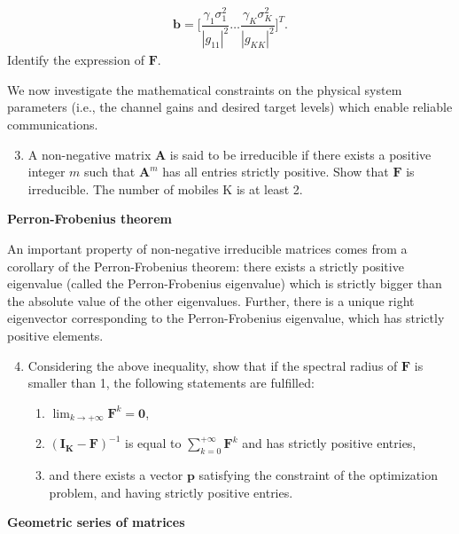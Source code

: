 \documentclass [a4paper, 11pt] {article}
\begin{document}
\begin{exercise}{2}
\begin{enumerate}
\begin{align}
    \mathbf{b} =  \Bigg[\dfrac{\gamma_1\sigma_1^2}{|g_{11}|^2} \hdots \dfrac{\gamma_K\sigma_K^2}{|g_{KK}|^2}\Bigg]^T.
\end{align}
Identify the expression of $\mathbf{F}$.
\end{enumerate}


We now investigate the mathematical constraints on the physical system parameters (i.e., the channel gains and desired target levels) which enable reliable communications. 

\begin{enumerate}
\setcounter{enumi}{2}
\item  A non-negative matrix $\mathbf{A}$ is said to be irreducible if there exists a positive integer $m$ such that $\mathbf{A}^m$ has all entries strictly positive. Show that $\mathbf{F}$ is irreducible. The number of mobiles K is at least 2.
\end{enumerate}


\textbf{Perron-Frobenius theorem}


An important property of non-negative irreducible matrices comes from a corollary of the Perron-Frobenius theorem: there exists a strictly positive eigenvalue (called the Perron-Frobenius eigenvalue) which is strictly bigger than the absolute value of the other eigenvalues. Further, there is a unique right eigenvector corresponding to the Perron-Frobenius eigenvalue, which has strictly positive elements.

\begin{enumerate}
\setcounter{enumi}{3}
\item Considering the above inequality, show that if the spectral radius of $\mathbf{F}$ is smaller than 1, the following statements are fulfilled:
\begin{enumerate}
    
    \item $\lim_{k\rightarrow + \infty} \mathbf{F}^k = \mathbf{0}$,
    \item $(\mathbf{I_K} - \mathbf{F})^{-1}$ is equal to $\sum_{k=0}^{+\infty} \mathbf{F}^k$ and has strictly positive entries,
    \item and there exists a vector $\mathbf{p}$ satisfying the constraint of the optimization problem, and having strictly positive entries.
\end{enumerate}
\end{enumerate}

\textbf{Geometric series of matrices}



\end{exercise}
\end{document}
